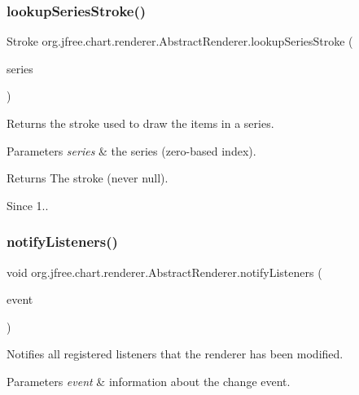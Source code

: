 \subsubsection{\texorpdfstring{lookup\+Series\+Stroke()}{lookupSeriesStroke()}}
{\footnotesize\ttfamily Stroke org.\+jfree.\+chart.\+renderer.\+Abstract\+Renderer.\+lookup\+Series\+Stroke (\begin{DoxyParamCaption}\item[{int}]{series }\end{DoxyParamCaption})}

Returns the stroke used to draw the items in a series.


\begin{DoxyParams}{Parameters}
{\em series} & the series (zero-\/based index).\\
\hline
\end{DoxyParams}
\begin{DoxyReturn}{Returns}
The stroke (never {\ttfamily null}).
\end{DoxyReturn}
\begin{DoxySince}{Since}
1.. 
\end{DoxySince}
\mbox{\label{classorg_1_1jfree_1_1chart_1_1renderer_1_1_abstract_renderer_aa8f8b8a3805788ff3cbfe102a4523a30}} 
\subsubsection{\texorpdfstring{notify\+Listeners()}{notifyListeners()}}
{\footnotesize\ttfamily void org.\+jfree.\+chart.\+renderer.\+Abstract\+Renderer.\+notify\+Listeners (\begin{DoxyParamCaption}\item[{\mbox{\hyperlink{classorg_1_1jfree_1_1chart_1_1event_1_1_renderer_change_event}{Renderer\+Change\+Event}}}]{event }\end{DoxyParamCaption})}

Notifies all registered listeners that the renderer has been modified.


\begin{DoxyParams}{Parameters}
{\em event} & information about the change event. \\
\hline
\end{DoxyParams}
\mbox{\label{classorg_1_1jfree_1_1chart_1_1renderer_1_1_abstract_renderer_ad051bf1700aac21a28e545e79ba1d7b3}} 
